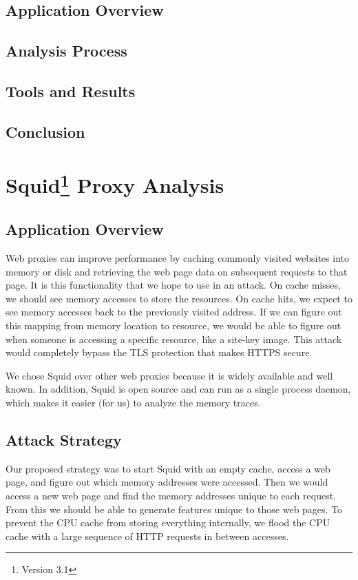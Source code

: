 \documentclass[11pt, oneside]{article}
\begin{document}
\subsection{Application Overview}
\subsection{Analysis Process}
\subsection{Tools and Results}
\subsection{Conclusion}

\section[Squid Proxy Analysis]{Squid\footnote{Version 3.1} Proxy Analysis}
\subsection{Application Overview}
Web proxies can improve performance by caching commonly visited websites 
into memory or disk and retrieving the web page data on subsequent requests 
to that page. It is this functionality that we hope to use in an attack. On 
cache misses, we should see memory accesses to store the resources. On 
cache hits, we expect to see memory accesses back to the previously visited
address. If we can figure out this mapping from memory location to resource,
we would be able to figure out when someone is accessing a specific resource, 
like a site-key image. This attack would completely bypass the TLS protection
that makes HTTPS secure.

We chose Squid over other web proxies because it is widely available and well 
known. In addition, Squid is open source and can run as a single process 
daemon, which makes it easier (for us) to analyze the memory traces.

\subsection{Attack Strategy}
Our proposed strategy was to start Squid with an empty cache, access a web 
page, and figure out which memory addresses were accessed. Then we would
access a new web page and find the memory addresses unique to each request. 
From this we should be able to generate features unique to those web pages.
To prevent the CPU cache from storing everything internally, we flood the
CPU cache with a large sequence of HTTP requests in between accesses.
\end{document}
